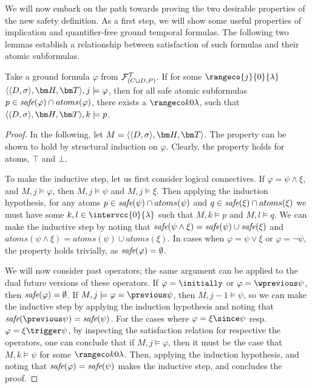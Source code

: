 We will now embark on the path towards proving the two desirable
properties of the new safety definition. As a first step, we will show
some useful properties of implication and quantifier-free ground
temporal formulas. The following two lemmas establish a relationship
between satisfaction of such formulas and their atomic subformulas.

\begin{lemma}\label{lemma:safe-atomic-subformula-satisfied}
  Take a ground formula $\varphi$ from $\mathcal{F}_{(C \cup D,P)}^\mathcal{T}$. If for some
  $\rangeco{j}{0}{\lambda}$\\ $\qthandt,j \models \varphi$, then for
  all safe atomic subformulas
  $p \in \textit{safe}(\varphi) \cap atoms(\varphi)$, there exists a
  $\kinlambda$, such that $\qthandt,k \models p$.
\end{lemma}
\begin{proof}
  In the following, let $M=\qthandt$. The property can be shown to
  hold by structural induction on $\varphi$. Clearly, the property
  holds for atoms, $\top$ and $\bot$.

  To make the inductive step, let us first consider logical
  connectives. If $\varphi = \psi \wedge \xi$, and
  $M,j \models \varphi$, then $M,j \models \psi$ and
  $M,j \models \xi$. Then applying the induction hypothesis, for any
  atoms $p \in \textit{safe}(\psi) \cap atoms(\psi)$ and
  $q \in \textit{safe}(\xi) \cap atoms(\xi)$ we must have some
  $k,l \in \intervcc{0}{\lambda}$ such that $M,k \models p$ and
  $M,l \models q$. We can make the inductive step by noting that
  $\textit{safe}(\psi \wedge \xi) = \textit{safe}(\psi) \cup \textit{safe}(\xi)$ and
  $atoms(\psi \wedge \xi) = atoms(\psi) \cup atoms(\xi)$. In cases
  when $\varphi = \psi \vee \xi$ or $\varphi = \neg \psi$, the
  property holds trivially, as $\textit{safe}(\varphi) = \emptyset$.

  We will now consider past operators; the same argument can be
  applied to the dual future versions of these operators. If
  $\varphi = \initially$ or $\varphi = \wprevious \psi$, then
  $\textit{safe}(\varphi) = \emptyset$. If
  $M,j \models \varphi = \previous \psi$, then $M,j-1 \models \psi$,
  so we can make the inductive step by applying the induction
  hypothesis and noting that
  $\safe{\previous \psi} = \safe{\psi}$. For the cases where
  $\varphi = \xi \since \psi$ resp.  $\varphi = \xi \trigger \psi$, by
  inspecting the satisfaction relation for respective the operators,
  one can conclude that if $M,j \models \varphi$, then it must be the
  case that $M,k \models \psi$ for some $\kinlambda$. Then, applying
  the induction hypothesis, and noting that
  $\textit{safe}(\varphi) = \textit{safe}(\psi)$ makes the inductive step, and
  concludes the proof.
  
\end{proof}

